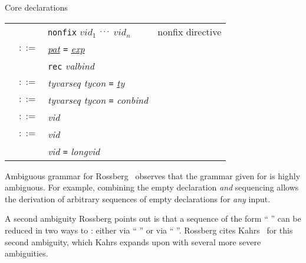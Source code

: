 \begin{grammar}{Core declarations}
\begin{longtable}{rcll}
&\alt&\texttt{nonfix} \optional{\textit{d}} $vid_{1}$ $\mathinner{{}^{\textstyle .\,.\,.}}$ $vid_{n}$
&nonfix directive\\
\label{grammar:valbind}\nonterminal{valbind} & $::=$ & \hyperref[grammar:pat]{\textit{pat}}
\texttt{=} \hyperref[grammar:exp]{\textit{exp}} \optional{\texttt{and} \textit{valbind}}\\
&\alt&\texttt{rec} \textit{valbind}\\
\label{grammar:typbind}\nonterminal{typbind} & $::=$ &
\textit{tyvarseq tycon} \texttt{=} \hyperref[grammar:ty]{\textit{ty}} \optional{\texttt{and} \textit{typbind}}\\
\label{grammar:datbind}\nonterminal{datbind} & $::=$ &
\textit{tyvarseq tycon} \texttt{=} \textit{conbind} \optional{\texttt{and} \textit{datbind}}\\
\label{grammar:conbind}\nonterminal{conbind} & $::=$ &
\optional{\texttt{op}}\textit{vid} \optional{\texttt{of} \hyperref[grammar:ty]{\textit{ty}}} \optional{\texttt{\char`\|} \textit{datbind}}\\
\label{grammar:exbind}\nonterminal{exbind} & $::=$ &
\optional{\texttt{op}}\textit{vid} \optional{\texttt{of} \hyperref[grammar:ty]{\textit{ty}}} \optional{\texttt{and} \textit{exbind}}\\ 
&\alt&\optional{\texttt{op}}\textit{vid} \texttt{=} \optional{\texttt{op}} \textit{longvid} \optional{\texttt{and} \textit{exbind}}\\ 
\end{longtable}
\end{grammar}


\begin{remark}{Ambiguous grammar for }
Rossberg~\cite{rossberg2018defects} observes that the grammar given for
 is highly ambiguous. For example, combining the empty
declaration \emph{and} sequencing allows the derivation of arbitrary
sequences of empty declarations for \emph{any} input.

A second ambiguity Rossberg points out is that a sequence of the form
``  ''
can be reduced in two ways to : either via
`` '' or via `` ''.
Rossberg cites Kahrs~\cite[\S8.3]{kahrs1993mistakes} for this second
ambiguity, which Kahrs expands upon with several more severe ambiguities.
\end{remark}

